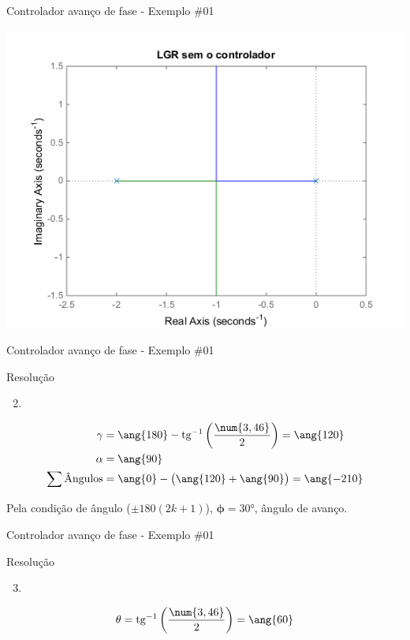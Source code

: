 \begin{frame}{Controlador avanço de fase - Exemplo \#01}
\centerline{\includegraphics[width=0.8\linewidth]{Figuras/Ch09/fig2.png}}
\end{frame}


\begin{frame}{Controlador avanço de fase - Exemplo \#01}
\begin{block}{Resolução}
\begin{enumerate}
	\setcounter{enumi}{1}
	\item 
\end{enumerate}
\begin{minipage}{0.35\linewidth}
	\centering
	
	\scalebox{0.7}{}
\end{minipage}
\hfill
\begin{minipage}{0.6\linewidth}
	\begin{align*}
	\gamma&=\ang{180}-\tg^{-1}\left( \dfrac{\num{3,46}}{2}\right)=\ang{120}\\
	\alpha&=\ang{90}\\
	\sum \text{Ângulos}&=\ang{0}-\left( \ang{120}+\ang{90}\right) =\ang{-210}
	\end{align*}
\end{minipage}

Pela condição de ângulo ($ \pm180(2k+1) $), \textbf{$ \bm{\phi=}\ang{30} $}, ângulo de avanço.
\end{block}
\end{frame}


\begin{frame}{Controlador avanço de fase - Exemplo \#01}
\begin{block}{Resolução}
\begin{enumerate}
	\setcounter{enumi}{2}
	\item 
\end{enumerate}

\centering

\scalebox{0.8}{}

\vspace{-0.5cm}

\[ \theta=\tg^{-1}\left( \dfrac{\num{3,46}}{2}\right) =\ang{60} \]
\end{block}
\end{frame}



